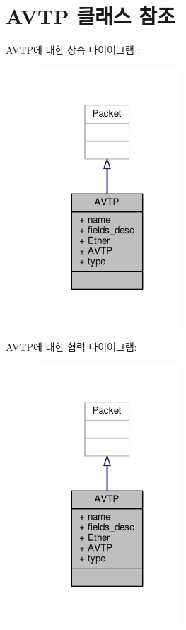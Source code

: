 \hypertarget{classavtp__astimes_1_1_a_v_t_p}{}\section{A\+V\+TP 클래스 참조}
\label{classavtp__astimes_1_1_a_v_t_p}


A\+V\+T\+P에 대한 상속 다이어그램 \+: 
\nopagebreak
\begin{figure}[H]
\begin{center}
\leavevmode
\includegraphics[width=155pt]{classavtp__astimes_1_1_a_v_t_p__inherit__graph}
\end{center}
\end{figure}


A\+V\+T\+P에 대한 협력 다이어그램\+:
\nopagebreak
\begin{figure}[H]
\begin{center}
\leavevmode
\includegraphics[width=155pt]{classavtp__astimes_1_1_a_v_t_p__coll__graph}
\end{center}
\end{figure}
